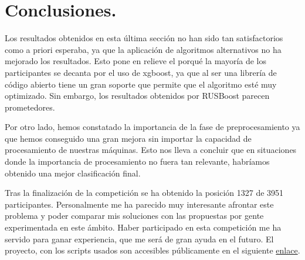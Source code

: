 \chapter{Conclusiones.}
Los resultados obtenidos en esta última sección no han sido tan satisfactorios como a priori esperaba, ya que la aplicación de algoritmos alternativos no ha mejorado los resultados. Esto pone en relieve el porqué la mayoría de los participantes se decanta por el uso de xgboost, ya que al ser una librería de código abierto tiene un gran soporte que permite que el algoritmo esté muy optimizado. Sin embargo, los resultados obtenidos por RUSBoost parecen prometedores.

\medskip 

Por otro lado, hemos constatado la importancia de la fase de preprocesamiento ya que hemos conseguido una gran mejora sin importar la capacidad de procesamiento de nuestras máquinas. Esto nos lleva a concluir que en situaciones donde la importancia de procesamiento no fuera tan relevante, habríamos obtenido una mejor clasificación final. 

\medskip

Tras la finalización de la competición se ha obtenido la posición 1327 de 3951 participantes. Personalmente me ha parecido muy interesante afrontar este problema y poder comparar mis soluciones con las propuestas por gente experimentada en este ámbito. Haber participado en esta competición me ha servido para ganar experiencia, que me será de gran ayuda en el futuro. El proyecto, con los scripts usados son accesibles públicamente en el siguiente \href{https://github.com/daniL16/kaggle-talking-data}{enlace}.